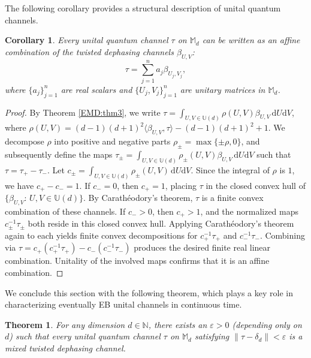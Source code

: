 \documentclass[11pt,reqno]{amsart}
\theoremstyle{definition}
\theoremstyle{plain}
\newtheorem{thm}[defn]{Theorem}
\newtheorem{cor}[defn]{Corollary}
\theoremstyle{remark}
\numberwithin{equation}{section}%
\begin{document}
The following corollary provides a structural description of unital quantum channels.



  
  \begin{cor}\label{description of UCPTP}
	Every unital quantum channel $\tau$ on $\mathbb{M}_d$ can be written as an affine combination of the twisted dephasing channels $\beta_{U,V}$: 
	\[
	\tau = \sum_{j=1}^n a_j \beta_{U_j, V_j},
	\] where $\{a_j\}_{j=1}^n$ are real scalars and $\{U_j, V_j\}_{j=1}^n$ are unitary matrices in $\mathbb{M}_d$.
\end{cor}

\begin{proof}
	By Theorem \ref{EMD:thm3}, we write $\tau = \int_{U,V \in \mathbb{U}(d)} \rho(U, V) \beta_{U,V} \, \mathrm{d}U \mathrm{d}V$, where $\rho(U, V) = (d-1)(d+1)^2 \langle \beta_{U,V}, \tau \rangle - (d-1)(d+1)^2 + 1$. We decompose $\rho$ into positive and negative parts $\rho_\pm = \max\{\pm\rho, 0\}$, and subsequently define the maps $\tau_\pm = \int_{U,V \in \mathbb{U}(d)} \rho_\pm(U,V) \beta_{U,V} \, \mathrm{d}U \mathrm{d}V$ such that $\tau = \tau_+ - \tau_-$. Let $c_\pm = \int_{U,V \in \mathbb{U}(d)} \rho_\pm(U,V) \, \mathrm{d}U \mathrm{d}V$. Since the integral of $\rho$ is $1$, we have $c_+ - c_- = 1$. If $c_- = 0$, then $c_+ = 1$, placing $\tau$ in the closed convex hull of $\{\beta_{U,V}:\, U,V\in\mathbb{U}(d)\}$. By Carath\'{e}odory's theorem, $\tau$ is a finite convex combination of these channels. If $c_- > 0$, then $c_+ > 1$, and the normalized maps $c_\pm^{-1} \tau_\pm$ both reside in this closed convex hull. Applying Carath\'{e}odory's theorem again to each yields finite convex decompositions for $c_+^{-1} \tau_+$ and $c_-^{-1} \tau_-$. Combining via $\tau = c_+(c_+^{-1} \tau_+) - c_-(c_-^{-1} \tau_-)$ produces the desired finite real linear combination. Unitality of the involved maps confirms that it is an affine combination.
\end{proof}


We conclude this section with the following theorem, which plays a key role in characterizing eventually EB unital channels in continuous time.


\begin{thm}\label{EMD:cor2}
	For any dimension $d \in \mathbb{N}$, there exists an $\varepsilon > 0$ (depending only on $d$) such that every unital quantum channel $\tau$ on $\mathbb{M}_d$ satisfying $\|\tau - \delta_d\| < \varepsilon$ is a mixed twisted dephasing channel.
\end{thm}
\end{document}

